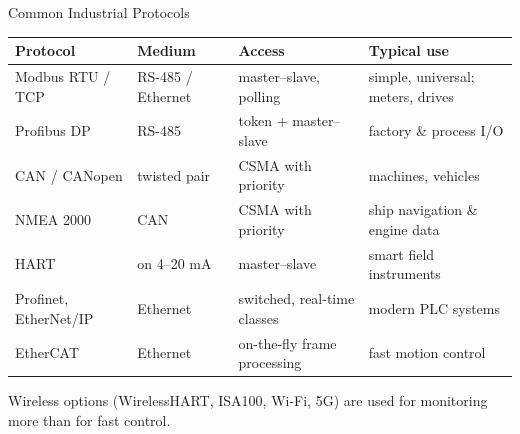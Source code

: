 \documentclass[aspectratio=169]{beamer}
\begin{document}
	\begin{frame}{Common Industrial Protocols}
		\renewcommand{\arraystretch}{1.2}
		\centering
		\small
		\begin{tabular}{@{}>{\raggedright}p{2.6cm}>{\raggedright}p{2.8cm}>{\raggedright}p{3.4cm}>{\raggedright\arraybackslash}p{3.8cm}@{}}
			\toprule
			\textbf{Protocol} & \textbf{Medium} & \textbf{Access} & \textbf{Typical use} \\
			\midrule
			Modbus RTU / TCP   & RS-485 / Ethernet & master--slave, polling  & simple, universal; meters, drives \\
			Profibus DP        & RS-485            & token + master--slave   & factory \& process I/O \\
			CAN / CANopen      & twisted pair      & CSMA with priority      & machines, vehicles \\
			NMEA 2000          & CAN               & CSMA with priority      & ship navigation \& engine data \\
			HART               & on 4--20 mA       & master--slave           & smart field instruments \\
			Profinet, EtherNet/IP & Ethernet       & switched, real-time classes & modern PLC systems \\
			EtherCAT           & Ethernet          & on-the-fly frame processing & fast motion control \\
			\bottomrule
		\end{tabular}
		\vspace{0.2cm}

		\footnotesize\centering Wireless options (WirelessHART, ISA100, Wi-Fi, 5G) are used for monitoring more than for fast control.
	\end{frame}
\end{document}
